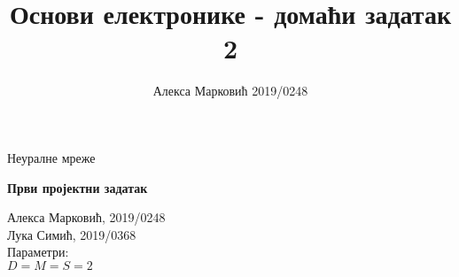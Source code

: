 \documentclass[10pt,a4paper,titlepage,serbianc]{article}
\author{Алекса Марковић 2019/0248}
\title{Основи електронике - домаћи задатак 2}
\begin{document}
\lstset{language=Python,breaklines=true} 
\begin{titlepage}
\begin{center}
{\Large Неуралне мреже \par}
\begin{huge}
\sc\textbf{Први пројектни задатак}
\par
\end{huge}
\vspace{1cm}
\begin{large}
Алекса Марковић, 2019/0248 \\
Лука Симић, 2019/0368
\\
\vspace{1cm}
Параметри:\\
\vspace{0.5cm}
$D = M = S = 2$
\end{large}
\end{center}

\end{titlepage}
\end{document}
